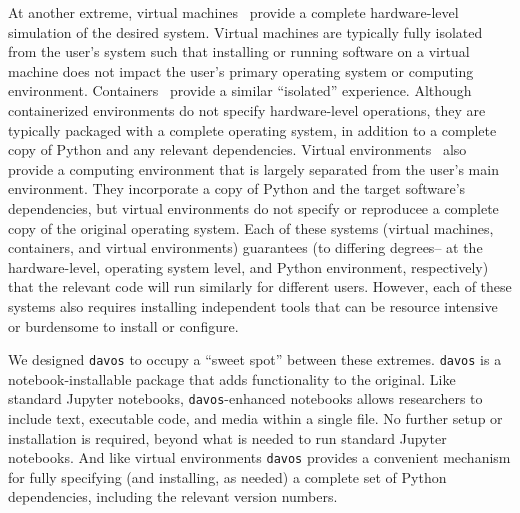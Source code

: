 \documentclass[preprint,12pt, a4paper]{elsarticle}
\begin{document}
At another extreme, virtual machines~\citep{Gold74, AltiEtal05, vmware} provide a complete hardware-level
simulation of the desired system.  Virtual machines are typically
fully isolated from the user's system such that installing or running
software on a virtual machine does not impact the user's primary
operating system or computing environment.  Containers~\citep[e.g.,][]{Merk14,
  KurtEtal17} provide a similar ``isolated'' experience.  Although
containerized environments do not specify hardware-level operations,
they are typically packaged with a complete operating system, in
addition to a complete copy of Python and any relevant dependencies.
Virtual environments~\citep[e.g.,][]{vanREtal14} also provide a
computing environment that is largely separated from the user's main
environment.  They incorporate a copy of Python and the target
software's dependencies, but virtual environments do not specify or
reproducee a complete copy of the original operating system.  Each of
these systems (virtual machines, containers, and virtual environments)
guarantees (to differing degrees-- at the hardware-level, operating system
level, and Python environment, respectively) that the relevant code
will run similarly for different users.  However, each of these
systems also requires installing independent tools that
can be resource intensive or burdensome to install or configure.

We designed \texttt{davos} to occupy a ``sweet spot'' between these
extremes.  \texttt{davos} is a notebook-installable package that adds
functionality to the original.  Like standard Jupyter notebooks,
\texttt{davos}-enhanced notebooks allows researchers to include text,
executable code, and media within a single file.  No further setup or
installation is required, beyond what is needed to run standard
Jupyter notebooks.  And like virtual environments \texttt{davos}
provides a convenient mechanism for fully specifying (and installing,
as needed) a complete set of Python dependencies, including the
relevant version numbers.






\end{document}

